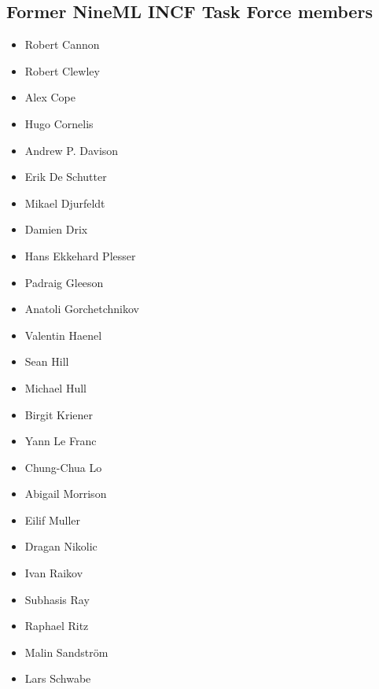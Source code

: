 \documentclass[draftspec]{ninemlspec}
\begin{document}
\subsection{Former NineML INCF Task Force members}
\label{sec:task_force}
\begin{multicols}{2}
\begin{itemize}
\item     Robert Cannon
\item     Robert Clewley
\item     Alex Cope
\item     Hugo Cornelis
\item     Andrew P. Davison
\item     Erik De Schutter
\item     Mikael Djurfeldt
\item     Damien Drix
\item     Hans Ekkehard Plesser
\item     Padraig Gleeson
\item     Anatoli Gorchetchnikov
\item     Valentin Haenel
\item     Sean Hill
\item     Michael Hull
\item     Birgit Kriener
\item     Yann Le Franc
\item     Chung-Chua Lo
\item     Abigail Morrison
\item     Eilif Muller
\item     Dragan Nikolic
\item     Ivan Raikov
\item     Subhasis Ray
\item     Raphael Ritz
\item     Malin Sandstr\"{o}m
\item     Lars Schwabe
\end{itemize}
\end{multicols}

\clearpage


\end{document}

